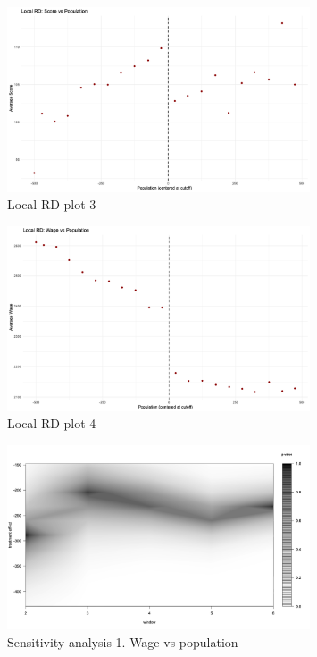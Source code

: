 \documentclass{article}
\begin{document}
\begin{figure}[H]
    \centering
    \includegraphics[width=0.8\textwidth]{figures/q1_3.png}
    \caption{Local RD plot 3}
    \label{fig:rd1_3}
\end{figure}


\begin{figure}[H]
    \centering
    \includegraphics[width=0.8\textwidth]{figures/q1_4.png}
    \caption{Local RD plot 4}
    \label{fig:rd1_4}
\end{figure}

\begin{figure}[H]
    \centering
    \includegraphics[width=0.8\textwidth]{figures/q1_sensitivity_1.png}
    \caption{Sensitivity analysis 1. Wage vs population}
    \label{fig:q1_sensitivity_1}
\end{figure}
\end{document}
